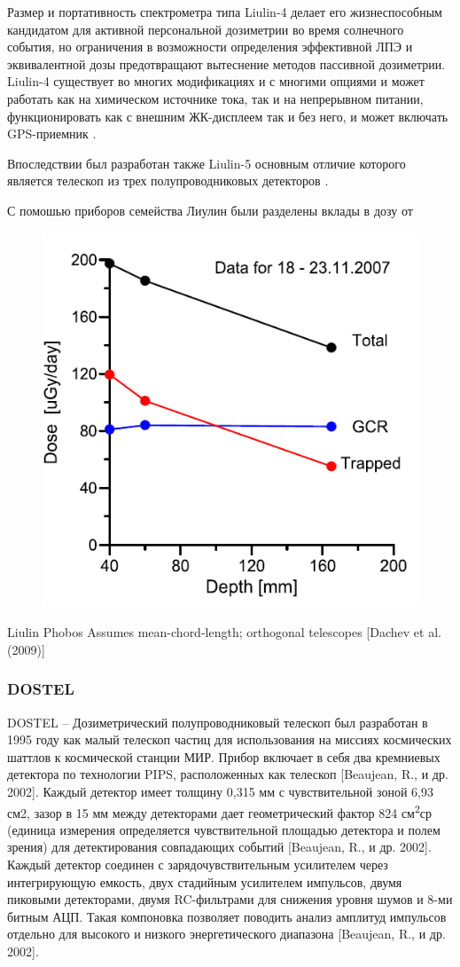 Размер и портативность спектрометра типа Liulin-4 делает его жизнеспособным кандидатом для активной персональной дозиметрии во время солнечного события, но ограничения в возможности определения эффективной ЛПЭ и эквивалентной дозы предотвращают вытеснение методов пассивной дозиметрии. Liulin-4 существует во многих модификациях и с многими опциями и может работать как на химическом источнике тока, так и на непрерывном питании, функционировать как с внешним ЖК-дисплеем так и без него, и может включать GPS-приемник \cite{Dachev2002}.	

Впоследствии был разработан также Liulin-5 основным отличие которого является телескоп из трех полупроводниковых детекторов \cite{Semkova2013}.


С помошью приборов семейства Лиулин были разделены вклады в дозу от 
\begin{figure}
	\centering
	\includegraphics[width=0.7\linewidth]{images/liulinGCRSAA}
	\caption{}
	\label{fig:liulingcrsaa}
\end{figure}


Liulin Phobos Assumes mean-chord-length; orthogonal telescopes [Dachev et al. (2009)]

\subsubsection{DOSTEL}

DOSTEL -- Дозиметрический полупроводниковый телескоп был разработан в 1995 году как малый телескоп частиц для использования на миссиях космических шаттлов к космической станции МИР. Прибор включает в себя два кремниевых детектора по технологии PIPS, расположенных как телескоп [Beaujean, R., и др. 2002]. Каждый детектор имеет толщину 0,315 мм с чувствительной зоной 6,93 см2, зазор в 15 мм между детекторами дает геометрический фактор 824 см\textsuperscript{2}ср (единица измерения определяется чувствительной площадью детектора и полем зрения) для детектирования совпадающих событий [Beaujean, R., и др. 2002]. Каждый детектор соединен с зарядочувствительным усилителем через интегрирующую емкость, двух стадийным усилителем импульсов, двумя пиковыми детекторами, двумя RC-фильтрами для снижения уровня шумов и 8-ми битным АЦП. Такая компоновка позволяет поводить анализ амплитуд импульсов отдельно для высокого и низкого энергетического диапазона [Beaujean, R., и др. 2002].


